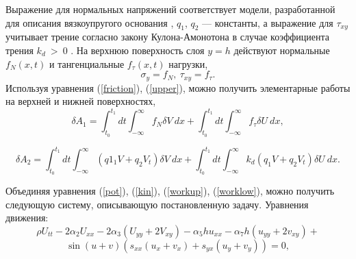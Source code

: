 Выражение для нормальных напряжений соответствует модели, разработанной для описания вязкоупругого основания \cite{bound_Kerr}, $q_1$, $q_2$ --- константы, а выражение для $\tau_{xy}$ учитывает трение согласно закону Кулона-Амонотона в случае коэффициента трения $k_d ~> ~0$ \cite{bound_Hahner}. На верхнюю поверхность слоя $y = h$ действуют нормальные $f_N (x, t)$ и тангенциальные $f_\tau (x, t)$ нагрузки,
\begin{equation}
	\sigma_{y}=f_{N}, ~\tau_{xy}=f_{\tau}. \label{upper}
\end{equation}
Используя уравнения (\ref{friction}), (\ref{upper}), можно получить элементарные работы на верхней и нижней поверхностях,
\begin{equation}
	\delta A_1 =  \int_{t_0}^{t_1} dt\int_{-\infty}^{\infty}f_{N}\delta V \:  dx +\int_{t_0}^{t_1} dt  
	\int_{-\infty}^{\infty} f_{\tau}\delta U \: dx , \label{workup}
\end{equation}

\begin{equation}
	\delta A_2 =  \int_{t_0}^{t_1} dt \int_{-\infty}^{\infty}(q1_1 V + q_2 V_t)\delta V \:  dx + \int_{t_0}^{t_1} dt
	\int_{-\infty}^{\infty}k_d(q_1 V + q_2 V_t)\delta U \:  dx.  \label{worklow}
\end{equation}

Объединяя уравнения (\ref{pot}), (\ref{kin}), (\ref{workup}), (\ref{worklow}), можно получить следующую систему, описывающую постановленную задачу. Уравнения движения:
\[
\rho U_{tt} -2 \alpha_2 U_{xx} -2 \alpha_3 \left( U_{yy} + 2 V_{xy}\right) - \alpha_5 h u_{xx} - \alpha_7 h (u_{yy} + 2 v_{xy}) +
\]
\begin{equation}
	\sin{(u+v)}(s_{xx}(u_x + v_x)+ s_{yx}(u_y + v_y)) = 0, \label{beq1}
\end{equation}

